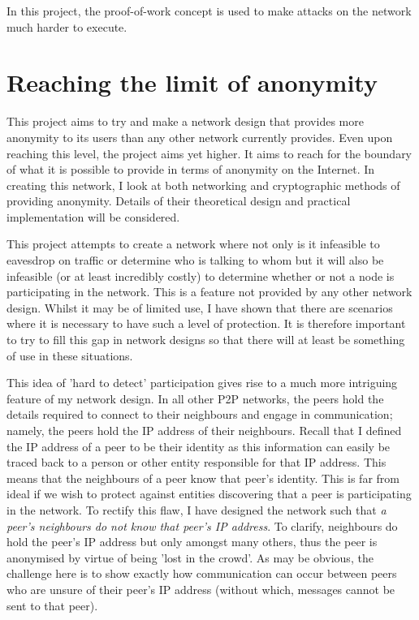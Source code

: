 \documentclass[ %
                    author={Luke Murray},
                supervisor={Dr. Simon Hollis},
                     title={Shadow Peer-to-Peer Networks},
                  subtitle={},
                    degree={MEng},
                      year={2013} ]{thesis}
\begin{document}
In this project, the proof-of-work concept is used to make attacks on the network much harder to execute.


\section{Reaching the limit of anonymity}

This project aims to try and make a network design that provides more anonymity to its users than any other network currently provides. Even upon reaching this level, the project aims yet higher. It aims to reach for the boundary of what it is possible to provide in terms of anonymity on the Internet. In creating this network, I look at both networking and cryptographic methods of providing anonymity. Details of their theoretical design and practical implementation will be considered.

This project attempts to create a network where not only is it infeasible to eavesdrop on traffic or determine who is talking to whom but it will also be infeasible (or at least incredibly costly) to determine whether or not a node is participating in the network. This is a feature not provided by any other network design. Whilst it may be of limited use, I have shown that there are scenarios where it is necessary to have such a level of protection. It is therefore important to try to fill this gap in network designs so that there will at least be something of use in these situations.

This idea of 'hard to detect' participation gives rise to a much more intriguing feature of my network design. In all other P2P networks, the peers hold the details required to connect to their neighbours and engage in communication; namely, the peers hold the IP address of their neighbours. Recall that I defined the IP address of a peer to be their identity as this information can easily be traced back to a person or other entity responsible for that IP address. This means that the neighbours of a peer know that peer's identity. This is far from ideal if we wish to protect against entities discovering that a peer is participating in the network. To rectify this flaw, I have designed the network such that {\em a peer's neighbours do not know that peer's IP address}. To clarify, neighbours do hold the peer's IP address but only amongst many others, thus the peer is anonymised by virtue of being 'lost in the crowd'. As may be obvious, the challenge here is to show exactly how communication can occur between peers who are unsure of their peer's IP address (without which, messages cannot be sent to that peer).
\end{document}
